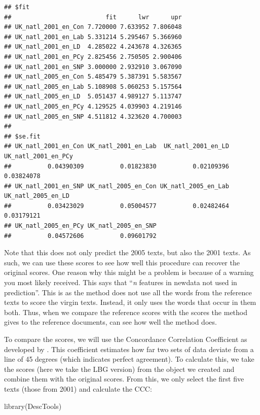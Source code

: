 \documentclass[
]{article}
\newenvironment{Shaded}{\begin{snugshade}}{\end{snugshade}}
\newcommand{\FunctionTok}[1]{\textcolor[rgb]{0.00,0.00,0.00}{#1}}
\newcommand{\NormalTok}[1]{#1}
\begin{document}
\begin{verbatim}
## $fit
##                          fit      lwr      upr
## UK_natl_2001_en_Con 7.720000 7.633952 7.806048
## UK_natl_2001_en_Lab 5.331214 5.295467 5.366960
## UK_natl_2001_en_LD  4.285022 4.243678 4.326365
## UK_natl_2001_en_PCy 2.825456 2.750505 2.900406
## UK_natl_2001_en_SNP 3.000000 2.932910 3.067090
## UK_natl_2005_en_Con 5.485479 5.387391 5.583567
## UK_natl_2005_en_Lab 5.108908 5.060253 5.157564
## UK_natl_2005_en_LD  5.051437 4.989127 5.113747
## UK_natl_2005_en_PCy 4.129525 4.039903 4.219146
## UK_natl_2005_en_SNP 4.511812 4.323620 4.700003
## 
## $se.fit
## UK_natl_2001_en_Con UK_natl_2001_en_Lab  UK_natl_2001_en_LD UK_natl_2001_en_PCy 
##          0.04390309          0.01823830          0.02109396          0.03824078 
## UK_natl_2001_en_SNP UK_natl_2005_en_Con UK_natl_2005_en_Lab  UK_natl_2005_en_LD 
##          0.03423029          0.05004577          0.02482464          0.03179121 
## UK_natl_2005_en_PCy UK_natl_2005_en_SNP 
##          0.04572606          0.09601792
\end{verbatim}

Note that this does not only predict the 2005 texts, but also the 2001 texts. As such, we can use these scores to see how well this procedure can recover the original scores. One reason why this might be a problem is because of a warning you most likely received. This says that ``\emph{n} features in newdata not used in prediction''. This is as the method does not use all the words from the reference texts to score the virgin texts. Instead, it only uses the words that occur in them both. Thus, when we compare the reference scores with the scores the method gives to the reference documents, can see how well the method does.

To compare the scores, we will use the Concordance Correlation Coefficient as developed by \textcite{Lin1989a}. This coefficient estimates how far two sets of data deviate from a line of 45 degrees (which indicates perfect agreement). To calculate this, we take the scores (here we take the LBG version) from the object we created and combine them with the original scores. From this, we only select the first five texts (those from 2001) and calculate the CCC:

\begin{Shaded}
\begin{Highlighting}[]
\FunctionTok{library}\NormalTok{(DescTools)}
\end{Highlighting}
\end{Shaded}
\end{document}
